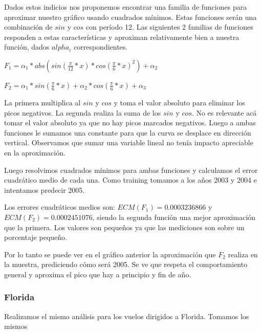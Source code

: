 Dados estos indicios nos proponemos encontrar una familia de funciones para aproximar nuestro gráfico usando cuadrados mínimos. Estas funciones serán una combinación de $sin$ y $cos$ con período 12. Las siguientes 2 familias de funciones responden a estas características y aproximan relativamente bien a nuestra función, dados $alpha_i$ correspondientes.


$F_1 = \alpha_1 * abs(sin(\frac{\pi}{12}*x) * cos(\frac{\pi}{6}*x)^2) + \alpha_2$

$F_2 = \alpha_1 * sin(\frac{\pi}{6}*x) + \alpha_2 * cos(\frac{\pi}{6}*x) + \alpha_3$


La primera multiplica al $sin$ y $cos$ y toma el valor absoluto para eliminar los picos negativos. La segunda realiza la suma de los $sin$ y $cos$. No es relevante acá tomar el valor absoluto ya que no hay picos marcados negativos. Luego a ambas funciones le sumamos una constante para que la curva se desplace en dirección vertical. Observamos que sumar una variable lineal no tenía impacto apreciable en la aproximación. 

Luego resolvimos cuadrados mínimos para ambas funciones y calculamos el error cuadrático medio de cada una. Como training tomamos a los años 2003 y 2004 e intentamos predecir 2005.

Los errores cuadráticos medios son: $ECM(F_1) = 0.0003236866$ y $ECM(F_2) = 0.0002451076$, siendo la segunda función una mejor aproximación que la primera. Los valores son pequeños ya que las mediciones son sobre un porcentaje pequeño.

Por lo tanto se puede ver en el gráfico anterior la aproximación que $F_2$ realiza en la muestra, prediciendo cómo será 2005. Se ve que respeta el comportamiento general y aproxima el pico que hay a principio y fin de año.

\subsubsection{Florida}

Realizamos el mismo análisis para los vuelos dirigidos a Florida. Tomamos los mismos 












